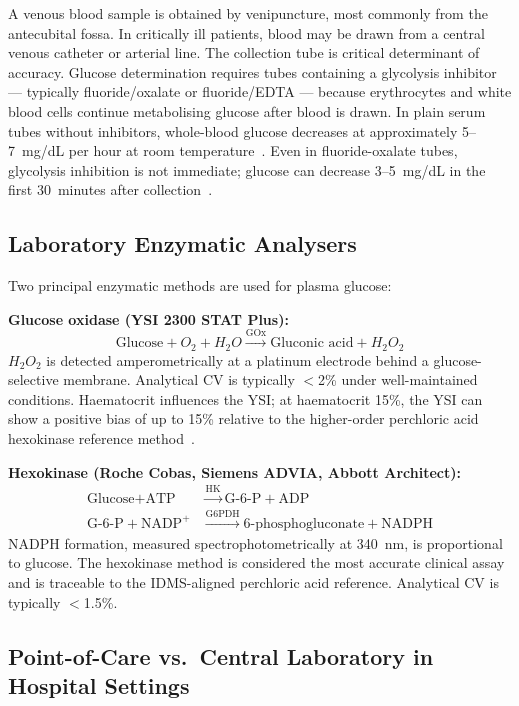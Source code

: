 A venous blood sample is obtained by venipuncture, most commonly from the antecubital fossa. In critically ill patients, blood may be drawn from a central venous catheter or arterial line. The collection tube is critical determinant of accuracy. Glucose determination requires tubes containing a glycolysis inhibitor --- typically fluoride/oxalate or fluoride/EDTA --- because erythrocytes and white blood cells continue metabolising glucose after blood is drawn. In plain serum tubes without inhibitors, whole-blood glucose decreases at approximately 5--7~mg/dL per hour at room temperature~\cite{iso15197standard}. Even in fluoride-oxalate tubes, glycolysis inhibition is not immediate; glucose can decrease 3--5~mg/dL in the first 30~minutes after collection~\cite{iso15197standard}.

\subsection*{Laboratory Enzymatic Analysers}

Two principal enzymatic methods are used for plasma glucose:

\textbf{Glucose oxidase (YSI 2300 STAT Plus):}
\[
  \text{Glucose} + O_2 + H_2O \xrightarrow{\text{GOx}} \text{Gluconic acid} + H_2O_2
\]
$H_2O_2$ is detected amperometrically at a platinum electrode behind a glucose-selective membrane. Analytical CV is typically $<$2\% under well-maintained conditions. Haematocrit influences the YSI; at haematocrit 15\%, the YSI can show a positive bias of up to 15\% relative to the higher-order perchloric acid hexokinase reference method~\cite{lyon2017hematocrit}.

\textbf{Hexokinase (Roche Cobas, Siemens ADVIA, Abbott Architect):}
\begin{align}
  \text{Glucose} + \text{ATP} &\xrightarrow{\text{HK}} \text{G-6-P} + \text{ADP} \\
  \text{G-6-P} + \text{NADP}^+ &\xrightarrow{\text{G6PDH}} 6\text{-phosphogluconate} + \text{NADPH}
\end{align}
NADPH formation, measured spectrophotometrically at 340~nm, is proportional to glucose. The hexokinase method is considered the most accurate clinical assay and is traceable to the IDMS-aligned perchloric acid reference. Analytical CV is typically $<$1.5\%.

\subsection*{Point-of-Care vs.\ Central Laboratory in Hospital Settings}

